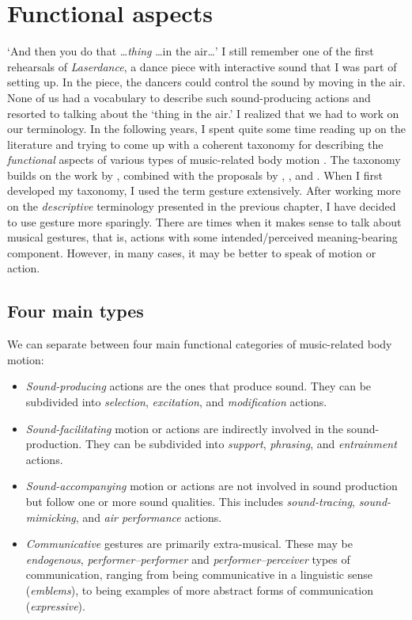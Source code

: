 \chapter{Functional aspects}
\label{sect:functional-aspects}

`And then you do that \ldots \emph{thing} \ldots in the air\ldots' I still remember one of the first rehearsals of \emph{Laserdance}, a dance piece with interactive sound that I was part of setting up. In the piece, the dancers could control the sound by moving in the air. None of us had a vocabulary to describe such sound-producing actions and resorted to talking about the `thing in the air.' I realized that we had to work on our terminology. In the following years, I spent quite some time reading up on the literature and trying to come up with a coherent taxonomy for describing the \emph{functional} aspects of various types of music-related body motion \citep{jensenius_musical_2010}. The taxonomy builds on the work by \citet{gibet_codage_1987}, combined with the proposals by \citet{cadoz_instrumental_1988}, \citet{delalande_gestique_1988}, and \citet{wanderley_gestural_2004}.
When I first developed my taxonomy, I used the term gesture extensively. After working more on the \emph{descriptive} terminology presented in the previous chapter, I have decided to use gesture more sparingly. There are times when it makes sense to talk about musical gestures, that is, actions with some intended/perceived meaning-bearing component. However, in many cases, it may be better to speak of motion or action.


\section{Four main types}

We can separate between four main functional categories of music-related body motion:

\begin{itemize}
\item \emph{Sound-producing} actions are the ones that produce sound. They can be subdivided into \emph{selection}, \emph{excitation}, and \emph{modification} actions.

\item \emph{Sound-facilitating} motion or actions are indirectly involved in the sound-production. They can be subdivided into \emph{support}, \emph{phrasing}, and \emph{entrainment} actions.

\item \emph{Sound-accompanying} motion or actions are not involved in sound production but follow one or more sound qualities. This includes \emph{sound-tracing}, \emph{sound-mimicking}, and \emph{air performance} actions.

\item \emph{Communicative} gestures are primarily extra-musical. These may be \emph{endogenous}, \emph{performer--performer} and \emph{performer--perceiver} types of communication, ranging from being communicative in a linguistic sense (\emph{emblems}), to being examples of more abstract forms of communication (\emph{expressive}).
\end{itemize}

